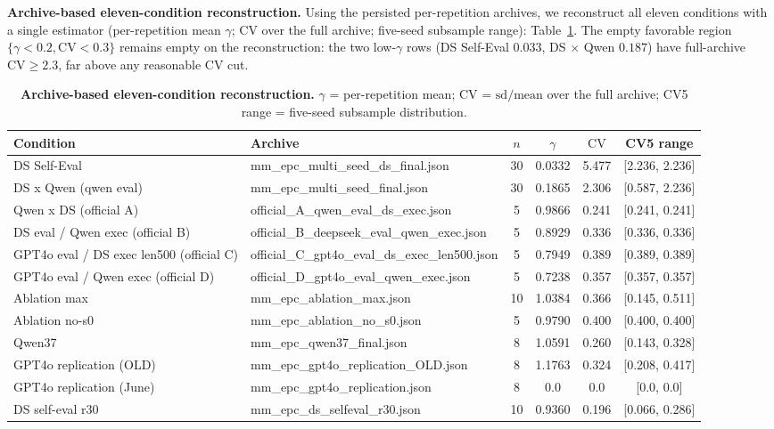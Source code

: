 \documentclass[11pt]{article}
\begin{document}
\noindent\textbf{Archive-based eleven-condition reconstruction.} Using the persisted per-repetition archives, we reconstruct all eleven conditions with a single estimator (per-repetition mean $\gamma$; $\mathrm{CV}$ over the full archive; five-seed subsample range): Table~\ref{tab:recon}. The empty favorable region $\{\gamma < 0.2, \mathrm{CV} < 0.3\}$ remains empty on the reconstruction: the two low-$\gamma$ rows (DS Self-Eval $0.033$, DS $\times$ Qwen $0.187$) have full-archive $\mathrm{CV} \geq 2.3$, far above any reasonable $\mathrm{CV}$ cut.

\begin{table}[t]
\centering
\caption{\textbf{Archive-based eleven-condition reconstruction.} $\gamma$ = per-repetition mean; $\mathrm{CV}$ = $\mathrm{sd}/\mathrm{mean}$ over the full archive; CV5 range = five-seed subsample distribution.}
\label{tab:recon}
\small
\begin{tabular}{@{}llcccc@{}}
\toprule
Condition & Archive & $n$ & $\gamma$ & $\mathrm{CV}$ & CV5 range \\
\midrule
    DS Self-Eval & mm\_epc\_multi\_seed\_ds\_final.json & 30 & 0.0332 & 5.477 & [2.236, 2.236] \\
    DS x Qwen (qwen eval) & mm\_epc\_multi\_seed\_final.json & 30 & 0.1865 & 2.306 & [0.587, 2.236] \\
    Qwen x DS (official A) & official\_A\_qwen\_eval\_ds\_exec.json & 5 & 0.9866 & 0.241 & [0.241, 0.241] \\
    DS eval / Qwen exec (official B) & official\_B\_deepseek\_eval\_qwen\_exec.json & 5 & 0.8929 & 0.336 & [0.336, 0.336] \\
    GPT4o eval / DS exec len500 (official C) & official\_C\_gpt4o\_eval\_ds\_exec\_len500.json & 5 & 0.7949 & 0.389 & [0.389, 0.389] \\
    GPT4o eval / Qwen exec (official D) & official\_D\_gpt4o\_eval\_qwen\_exec.json & 5 & 0.7238 & 0.357 & [0.357, 0.357] \\
    Ablation max & mm\_epc\_ablation\_max.json & 10 & 1.0384 & 0.366 & [0.145, 0.511] \\
    Ablation no-s0 & mm\_epc\_ablation\_no\_s0.json & 5 & 0.9790 & 0.400 & [0.400, 0.400] \\
    Qwen37 & mm\_epc\_qwen37\_final.json & 8 & 1.0591 & 0.260 & [0.143, 0.328] \\
    GPT4o replication (OLD) & mm\_epc\_gpt4o\_replication\_OLD.json & 8 & 1.1763 & 0.324 & [0.208, 0.417] \\
    GPT4o replication (June) & mm\_epc\_gpt4o\_replication.json & 8 & 0.0 & 0.0 & [0.0, 0.0] \\
    DS self-eval r30 & mm\_epc\_ds\_selfeval\_r30.json & 10 & 0.9360 & 0.196 & [0.066, 0.286] \\
\bottomrule
\end{tabular}
\end{table}
\end{document}
